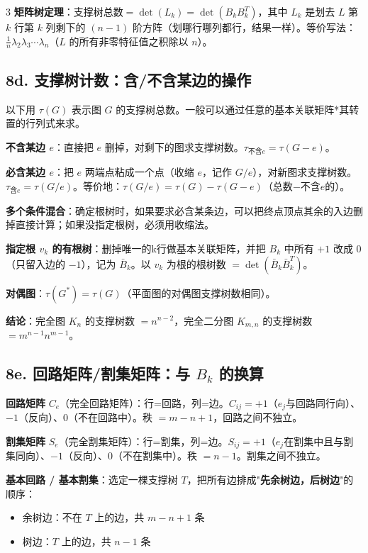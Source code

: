 \documentclass[10pt,a4paper,landscape]{ctexart}
\begin{document}
\begin{multicols}{3}
\textbf{矩阵树定理}：$\boxed{\text{支撑树总数}=\det(L_k)=\det(B_kB_k^T)}$，其中 $L_k$ 是划去 $L$ 第 $k$ 行第 $k$ 列剩下的 $(n-1)$ 阶方阵（划哪行哪列都行，结果一样）。等价写法：$\displaystyle\frac{1}{n}\lambda_2\lambda_3\cdots\lambda_n$（$L$ 的所有非零特征值之积除以 $n$）。

\subsection*{8d. 支撑树计数：含/不含某边的操作}

以下用 $\tau(G)$ 表示图 $G$ 的支撑树总数。一般可以通过任意的基本关联矩阵*其转置的行列式来求。

\textbf{不含某边 $e$}：直接把 $e$ 删掉，对剩下的图求支撑树数。$\boxed{\tau_{\text{不含}e}=\tau(G-e)}$。

\textbf{必含某边 $e$}：把 $e$ 两端点粘成一个点（收缩 $e$，记作 $G/e$），对新图求支撑树数。$\boxed{\tau_{\text{含}e}=\tau(G/e)}$。等价地：$\tau(G/e)=\tau(G)-\tau(G-e)$（总数$-$不含$e$的）。

\textbf{多个条件混合}：确定根树时，如果要求必含某条边，可以把终点顶点其余的入边删掉直接计算；如果没指定根树，必须用收缩法。

\textbf{指定根 $v_k$ 的有根树}：删掉唯一的k行做基本关联矩阵，并把 $B_k$ 中所有 $+1$ 改成 $0$（只留入边的 $-1$），记为 $\bar{B}_k$。以 $v_k$ 为根的根树数 $=\boxed{\det(\bar{B}_k\bar{B}_k^T)}$。

\textbf{对偶图}：$\tau(G^*)=\tau(G)$（平面图的对偶图支撑树数相同）。

\textbf{结论}：完全图 $K_n$ 的支撑树数 $=n^{n-2}$，完全二分图 $K_{m,n}$ 的支撑树数 $=m^{n-1}n^{m-1}$。

\subsection*{8e. 回路矩阵/割集矩阵：与 $B_k$ 的换算}

\textbf{回路矩阵} $C_e$（完全回路矩阵）：行=回路，列=边。$C_{ij}=+1$（$e_j$与回路同行向）、$-1$（反向）、$0$（不在回路中）。秩 $=m-n+1$，回路之间不独立。

\textbf{割集矩阵} $S_e$（完全割集矩阵）：行=割集，列=边。$S_{ij}=+1$（$e_j$在割集中且与割集同向）、$-1$（反向）、$0$（不在割集中）。秩 $=n-1$。割集之间不独立。

\textbf{基本回路 / 基本割集}：选定一棵支撑树 $T$，把所有边排成"\textbf{先余树边，后树边}"的顺序：
\begin{itemize}
\item 余树边：不在 $T$ 上的边，共 $m-n+1$ 条
\item 树边：$T$ 上的边，共 $n-1$ 条
\end{itemize}


\end{multicols}
\end{document}
